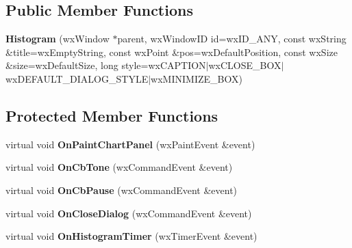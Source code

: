 \subsection*{Public Member Functions}
\begin{DoxyCompactItemize}
\item 
\mbox{\label{classHistogram_ac848a67231a6adea5e28f6dd71ae5305}} 
{\bfseries Histogram} (wx\+Window $\ast$parent, wx\+Window\+ID id=wx\+I\+D\+\_\+\+A\+NY, const wx\+String \&title=wx\+Empty\+String, const wx\+Point \&pos=wx\+Default\+Position, const wx\+Size \&size=wx\+Default\+Size, long style=wx\+C\+A\+P\+T\+I\+ON$\vert$wx\+C\+L\+O\+S\+E\+\_\+\+B\+OX$\vert$wx\+D\+E\+F\+A\+U\+L\+T\+\_\+\+D\+I\+A\+L\+O\+G\+\_\+\+S\+T\+Y\+LE$\vert$wx\+M\+I\+N\+I\+M\+I\+Z\+E\+\_\+\+B\+OX)
\end{DoxyCompactItemize}
\subsection*{Protected Member Functions}
\begin{DoxyCompactItemize}
\item 
\mbox{\label{classHistogram_a9ceb8d0d58815b3ea34e330275075938}} 
virtual void {\bfseries On\+Paint\+Chart\+Panel} (wx\+Paint\+Event \&event)
\item 
\mbox{\label{classHistogram_abc6e03ecf300afee8b8984fcc9136722}} 
virtual void {\bfseries On\+Cb\+Tone} (wx\+Command\+Event \&event)
\item 
\mbox{\label{classHistogram_aa369cdd590e696ac6add7b84b282f8b1}} 
virtual void {\bfseries On\+Cb\+Pause} (wx\+Command\+Event \&event)
\item 
\mbox{\label{classHistogram_a7bcd758bed45296191719d6c51382bb7}} 
virtual void {\bfseries On\+Close\+Dialog} (wx\+Command\+Event \&event)
\item 
\mbox{\label{classHistogram_a1158b00364c74ac2b537bf50da7fd394}} 
virtual void {\bfseries On\+Histogram\+Timer} (wx\+Timer\+Event \&event)
\end{DoxyCompactItemize}
